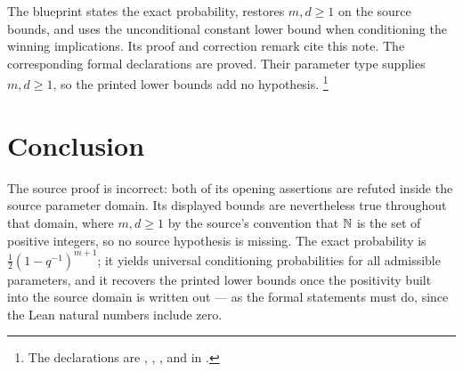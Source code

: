 \documentclass[11pt]{article}
\begin{document}
The blueprint states the exact probability, restores $m,d\geq1$ on the
source bounds, and uses the unconditional constant lower bound when
conditioning the winning implications.  Its proof and correction remark cite
this note. The corresponding formal declarations are proved. Their parameter
type supplies $m,d\geq1$, so the printed lower bounds add no hypothesis.%
\footnote{The declarations are ,
, , and
 in
.}

\section{Conclusion}

The source proof is incorrect: both of its opening assertions are refuted
inside the source parameter domain.  Its displayed bounds are nevertheless true
throughout that domain, where $m,d\geq1$ by the source's convention that $\mathbb{N}$
is the set of positive integers, so no source hypothesis is missing.  The exact
probability is $\frac12(1-q^{-1})^{m+1}$; it yields universal conditioning
probabilities for all admissible parameters, and it recovers the printed lower
bounds once the positivity built into the source domain is written out --- as
the formal statements must do, since the Lean natural numbers include zero.



\end{document}
